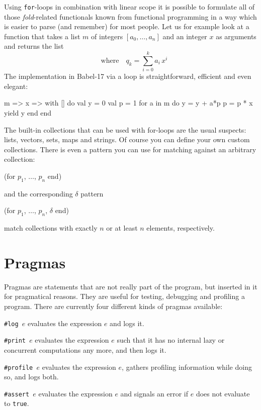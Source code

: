 \documentclass[11pt]{amsart}
\newcommand{\babelsrc}[1] {\lstinline!#1!}
\begin{document}
Using \babelsrc{for}-loops in combination with linear scope it is possible to formulate all of those \emph{fold}-related functionals known from functional programming in a way which is easier to parse (and remember) for most people. Let us for example look at a function that takes a list $m$ of integers $[a_0, \ldots, a_n]$ and an integer $x$ as arguments and returns the list
\begin{displaymath}
	[q_0, \ldots, q_n] \quad \text{where} \quad q_k = \sum_{i=0}^k a_i\, x^i
\end{displaymath}
The implementation in Babel-17 via a loop is straightforward, efficient and even elegant:
\begin{babellisting}
m => x => 
  with [] do 
    val y = 0
    val p = 1
    for a in m do 
      y = y + a*p
      p = p * x
      yield y
    end
 end
\end{babellisting}

The built-in collections that can be used with for-loops are the usual suspects: lists, vectors, sets, maps and strings. Of course you can define your own custom collections. There is even a pattern you can use for matching against an arbitrary collection:
\begin{babellisting}
(for $p_1$, $\ldots$, $p_n$ end)
\end{babellisting}
and the corresponding $\delta$ pattern
\begin{babellisting}
(for $p_1$, $\ldots$, $p_n$, $\delta$ end)
\end{babellisting}
match collections with exactly $n$ or at least $n$ elements, respectively. 

\section{Pragmas}
Pragmas are statements that are not really part of the program, but inserted in it for pragmatical reasons. They are useful for testing, debugging and profiling a program. There are currently four different kinds of  pragmas available:

\texttt{\#log $e$} evaluates the expression $e$ and logs it. 

\texttt{\#print $e$} evaluates the expression $e$ such that it has no internal lazy or concurrent computations any more, and then logs it.

\texttt{\#profile $e$} evaluates the expression $e$, gathers profiling information while doing so, and logs both.

\texttt{\#assert $e$} evaluates the expression $e$ and signals an error if $e$ does not evaluate to \babelsrc{true}.
\end{document}
